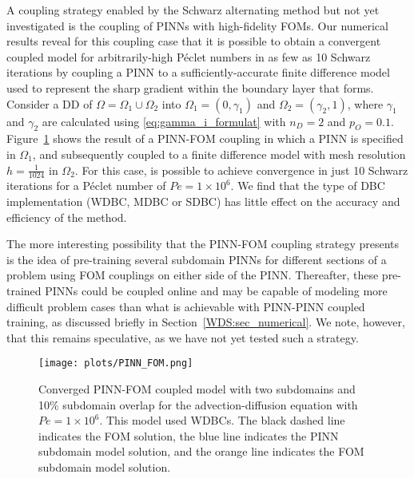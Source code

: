 \documentclass[oneside,final]{csri23}
\begin{document}
A coupling strategy enabled by the Schwarz alternating method but not yet investigated is the coupling of PINNs with high-fidelity FOMs.  
Our numerical results reveal for this coupling case that it is possible to obtain a convergent coupled model for arbitrarily-high P\'{e}clet numbers in as few as 10 Schwarz iterations by coupling a PINN to a sufficiently-accurate finite difference model used to represent the sharp gradient within the boundary layer that forms. Consider a DD of $\Omega = \Omega_1 \cup \Omega_2$ into $\Omega_1 = (0, \gamma_1)$ and $\Omega_2 = (\gamma_2, 1)$, where $\gamma_1$ and $\gamma_2$
are calculated using \eqref{eq:gamma_i_formulat} with $n_D = 2$ and $p_O = 0.1$. Figure~\ref{fig:pinn_fom} shows the result of a PINN-FOM coupling in which a PINN is specified in $\Omega_1$, and subsequently coupled to a finite difference model with mesh resolution $h = \frac{1}{1024}$ in $\Omega_2$. For this case, is possible to achieve convergence in just 10 Schwarz iterations for a P\'{e}clet number of $Pe = 1\times 10^6$.
We find that the type of DBC implementation (WDBC, MDBC or SDBC) has little effect on the accuracy and efficiency of the method.


The more interesting possibility that the PINN-FOM coupling strategy presents is the idea of pre-training several subdomain PINNs for different sections of a problem using FOM couplings on either side of the PINN. Thereafter, these pre-trained PINNs could be coupled online and may be capable of modeling more difficult problem cases than what is achievable with PINN-PINN coupled training, as discussed briefly in Section~\ref{WDS:sec_numerical}. We note, however, that this remains speculative, as we have not yet tested such a strategy. 

\begin{figure}[!htbp]
    \centering
    \texttt{[image: plots/PINN\_FOM.png]} 
    \caption{Converged PINN-FOM coupled model with two subdomains and 10\% subdomain overlap for the advection-diffusion equation with $Pe = 1\times 10^6$. This model used WDBCs. The black dashed line indicates the FOM solution, the blue line indicates the PINN subdomain model solution, and the orange line indicates the FOM subdomain model solution.}
    \label{fig:pinn_fom}
\end{figure}
\end{document}
